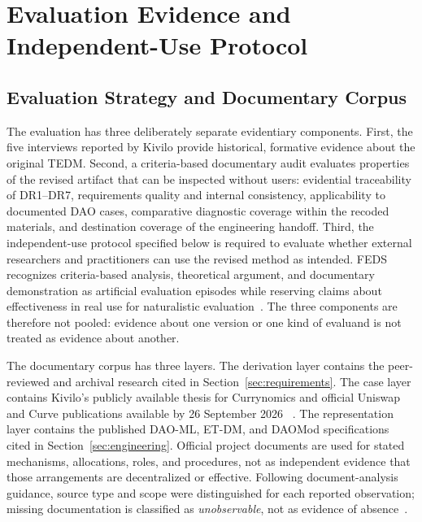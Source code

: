 \documentclass[referee,sn-basic]{sn-jnl}
\begin{document}
\section{Evaluation Evidence and Independent-Use Protocol}\label{sec:evaluation}

\subsection{Evaluation Strategy and Documentary Corpus}
\label{subsec:evaluation-criteria}

The evaluation has three deliberately separate evidentiary components. First,
the five interviews reported by Kivilo provide historical, formative evidence
about the original TEDM. Second, a criteria-based documentary audit evaluates
properties of the revised artifact that can be inspected without users:
evidential traceability of DR1--DR7, requirements quality and internal
consistency, applicability to documented DAO cases, comparative diagnostic
coverage within the recoded materials, and destination coverage of the
engineering handoff. Third, the independent-use protocol specified below is
required to evaluate whether external researchers and practitioners can use
the revised method as intended. FEDS recognizes criteria-based analysis,
theoretical argument, and documentary demonstration as artificial evaluation
episodes while reserving claims about effectiveness in real use for
naturalistic evaluation~\cite{Venable2016}. The three components are therefore
not pooled: evidence about one version or one kind of evaluand is not treated as
evidence about another.

The documentary corpus has three layers. The derivation layer contains the
peer-reviewed and archival research cited in Section~\ref{sec:requirements}.
The case layer contains Kivilo's publicly available thesis for Currynomics and
official Uniswap and Curve publications available by 26 September 2026
~\cite{Kivilo2023TokenEconomy,Uniswap2020UNI,Uniswap2021V3,
CurveDAO2020,CurveDocs2026}. The representation layer contains the published
DAO-ML, ET-DM, and DAOMod specifications cited in Section~\ref{sec:engineering}.
Official project documents are used for stated mechanisms, allocations, roles,
and procedures, not as independent evidence that those arrangements are
decentralized or effective. Following document-analysis guidance, source type
and scope were distinguished for each reported observation; missing documentation is classified
as \emph{unobservable}, not as evidence of absence~\cite{Bowen2009}.
\end{document}

